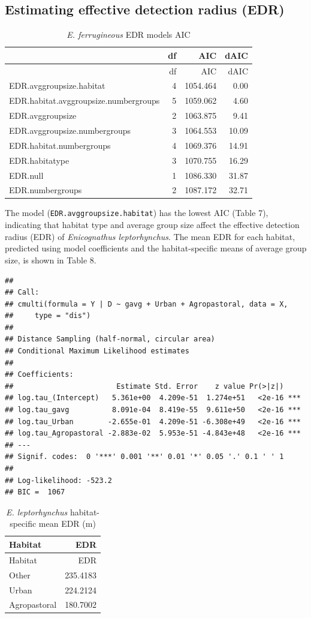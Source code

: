 \documentclass[]{article}
\begin{document}
\subsection{Estimating effective detection radius
(EDR)}\label{estimating-effective-detection-radius-edr-1}

\begin{longtable}[]{@{}lrrr@{}}
\caption{\textit{E. ferrugineous} EDR models AIC}\tabularnewline
\toprule
& df & AIC & dAIC\tabularnewline
\midrule
\endfirsthead
\toprule
& df & AIC & dAIC\tabularnewline
\midrule
\endhead
EDR.avggroupsize.habitat & 4 & 1054.464 & 0.00\tabularnewline
EDR.habitat.avggroupsize.numbergroups & 5 & 1059.062 &
4.60\tabularnewline
EDR.avggroupsize & 2 & 1063.875 & 9.41\tabularnewline
EDR.avggroupsize.numbergroups & 3 & 1064.553 & 10.09\tabularnewline
EDR.habitat.numbergroups & 4 & 1069.376 & 14.91\tabularnewline
EDR.habitatype & 3 & 1070.755 & 16.29\tabularnewline
EDR.null & 1 & 1086.330 & 31.87\tabularnewline
EDR.numbergroups & 2 & 1087.172 & 32.71\tabularnewline
\bottomrule
\end{longtable}

The model (\texttt{EDR.avggroupsize.habitat}) has the lowest AIC (Table
7), indicating that habitat type and average group size affect the
effective detection radius (EDR) of \emph{Enicognathus leptorhynchus}.
The mean EDR for each habitat, predicted using model coefficients and
the habitat-specific means of average group size, is shown in Table 8.

\begin{verbatim}
## 
## Call:
## cmulti(formula = Y | D ~ gavg + Urban + Agropastoral, data = X, 
##     type = "dis")
## 
## Distance Sampling (half-normal, circular area)
## Conditional Maximum Likelihood estimates
## 
## Coefficients:
##                        Estimate Std. Error    z value Pr(>|z|)    
## log.tau_(Intercept)   5.361e+00  4.209e-51  1.274e+51   <2e-16 ***
## log.tau_gavg          8.091e-04  8.419e-55  9.611e+50   <2e-16 ***
## log.tau_Urban        -2.655e-01  4.209e-51 -6.308e+49   <2e-16 ***
## log.tau_Agropastoral -2.883e-02  5.953e-51 -4.843e+48   <2e-16 ***
## ---
## Signif. codes:  0 '***' 0.001 '**' 0.01 '*' 0.05 '.' 0.1 ' ' 1 
## 
## Log-likelihood: -523.2 
## BIC =  1067
\end{verbatim}

\begin{longtable}[]{@{}lr@{}}
\caption{\textit{E. leptorhynchus} habitat-specific mean EDR
(m)}\tabularnewline
\toprule
Habitat & EDR\tabularnewline
\midrule
\endfirsthead
\toprule
Habitat & EDR\tabularnewline
\midrule
\endhead
Other & 235.4183\tabularnewline
Urban & 224.2124\tabularnewline
Agropastoral & 180.7002\tabularnewline
\bottomrule
\end{longtable}
\end{document}
